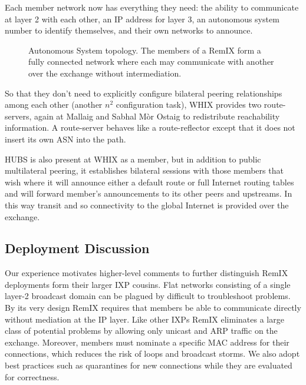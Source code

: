 Each member network now has everything they need: the ability to
communicate at layer 2 with each other, an IP address for layer 3, an
autonomous system number to identify themselves, and their own
networks to announce.
\begin{figure}[h]
  \resizebox{\linewidth}{!}{
    \begin{tikzpicture}
      \whixtopodiagram
    \end{tikzpicture}
  }
  \caption{
  Autonomous System topology. The members of a RemIX form a fully
  connected network where each may communicate with another over the
  exchange without intermediation.
  }
\end{figure}
So that they don't need to explicitly configure bilateral peering
relationships among each other (another $n^2$ configuration
task), \ac{WHIX} provides two route-servers, again at Mallaig and
Sabhal M\`{o}r Ostaig to redistribute reachability information. A
route-server behaves like a route-reflector except that it does not
insert its own \ac{ASN} into the path.

HUBS is also present at \ac{WHIX} as a member, but in addition to
public multilateral peering, it establishes bilateral sessions with
those members that wish where it will announce either a default route
or full Internet routing tables and will forward member's
announcements to its other peers and upstreams. In this way transit
and so connectivity to the global Internet is provided over the
exchange.


\subsection{Deployment Discussion}

Our experience motivates higher-level comments to further distinguish
RemIX deployments form their larger \ac{IXP} cousins. Flat networks
consisting of a single layer-2 broadcast domain can be plagued by
difficult to troubleshoot problems. By its very design RemIX requires
that members be able to communicate directly without mediation at the
IP layer. Like other \acp{IXP} RemIX eliminates a large class of
potential problems by allowing only unicast and \acs{ARP} traffic on
the exchange. Moreover, members must nominate a specific \acs{MAC}
address for their connections, which reduces the risk of loops and
broadcast storms. We also adopt best practices such as quarantines for
new connections while they are evaluated for correctness.

